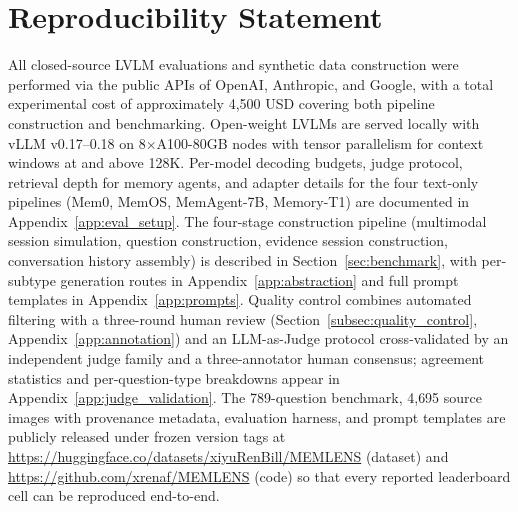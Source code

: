 \documentclass{article}
\begin{document}
\section*{Reproducibility Statement}

All closed-source LVLM evaluations and synthetic data construction were performed via the public APIs of OpenAI, Anthropic, and Google, with a total experimental cost of approximately 4{,}500 USD covering both pipeline construction and benchmarking. Open-weight LVLMs are served locally with vLLM v0.17--0.18 on 8$\times$A100-80GB nodes with tensor parallelism for context windows at and above 128K. Per-model decoding budgets, judge protocol, retrieval depth for memory agents, and adapter details for the four text-only pipelines (Mem0, MemOS, MemAgent-7B, Memory-T1) are documented in Appendix~\ref{app:eval_setup}. The four-stage construction pipeline (multimodal session simulation, question construction, evidence session construction, conversation history assembly) is described in Section~\ref{sec:benchmark}, with per-subtype generation routes in Appendix~\ref{app:abstraction} and full prompt templates in Appendix~\ref{app:prompts}. Quality control combines automated filtering with a three-round human review (Section~\ref{subsec:quality_control}, Appendix~\ref{app:annotation}) and an LLM-as-Judge protocol cross-validated by an independent judge family and a three-annotator human consensus; agreement statistics and per-question-type breakdowns appear in Appendix~\ref{app:judge_validation}. The 789-question benchmark, 4{,}695 source images with provenance metadata, evaluation harness, and prompt templates are publicly released under frozen version tags at \url{https://huggingface.co/datasets/xiyuRenBill/MEMLENS} (dataset) and \url{https://github.com/xrenaf/MEMLENS} (code) so that every reported leaderboard cell can be reproduced end-to-end.




\end{document}
